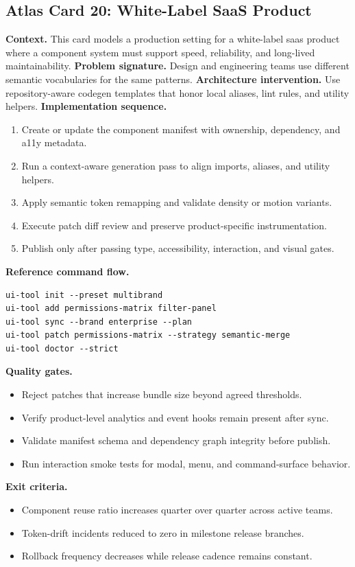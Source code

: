 \subsection*{Atlas Card 20: White-Label SaaS Product}
\textbf{Context.} This card models a production setting for a white-label saas product where a component system must support speed, reliability, and long-lived maintainability.
\textbf{Problem signature.} Design and engineering teams use different semantic vocabularies for the same patterns.
\textbf{Architecture intervention.} Use repository-aware codegen templates that honor local aliases, lint rules, and utility helpers.
\textbf{Implementation sequence.}
\begin{enumerate}[leftmargin=*, itemsep=0.28em]
  \item Create or update the component manifest with ownership, dependency, and a11y metadata.
  \item Run a context-aware generation pass to align imports, aliases, and utility helpers.
  \item Apply semantic token remapping and validate density or motion variants.
  \item Execute patch diff review and preserve product-specific instrumentation.
  \item Publish only after passing type, accessibility, interaction, and visual gates.
\end{enumerate}
\textbf{Reference command flow.}
\begin{verbatim}
ui-tool init --preset multibrand
ui-tool add permissions-matrix filter-panel
ui-tool sync --brand enterprise --plan
ui-tool patch permissions-matrix --strategy semantic-merge
ui-tool doctor --strict
\end{verbatim}
\textbf{Quality gates.}
\begin{itemize}[leftmargin=*, itemsep=0.24em]
  \item Reject patches that increase bundle size beyond agreed thresholds.
  \item Verify product-level analytics and event hooks remain present after sync.
  \item Validate manifest schema and dependency graph integrity before publish.
  \item Run interaction smoke tests for modal, menu, and command-surface behavior.
\end{itemize}
\textbf{Exit criteria.}
\begin{itemize}[leftmargin=*, itemsep=0.24em]
  \item Component reuse ratio increases quarter over quarter across active teams.
  \item Token-drift incidents reduced to zero in milestone release branches.
  \item Rollback frequency decreases while release cadence remains constant.
\end{itemize}
\clearpage
